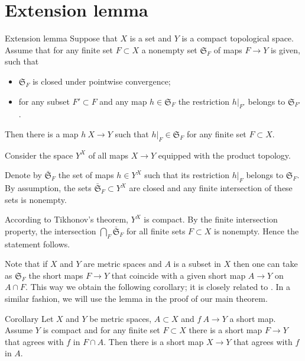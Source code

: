 \section{Extension lemma}\label{Finite-whole extension lemma}

\begin{thm}{Extension lemma}\label{lem:finite-whole}
Suppose that $X$ is a set 
and $Y$ is a compact topological space.
Assume that for any finite set $F\subset X$ 
a nonempty set $\mathfrak{S}_F$ of maps  $F\to Y$ is given, such that
\begin{itemize}
\item $\mathfrak{S}_F$ is closed under pointwise convergence;
\item for any subset $F'\subset F$ and any map $h\in \mathfrak{S}_F$
the restriction $h|_{F'}$ belongs to $\mathfrak{S}_{F'}$. 
\end{itemize}

Then there is a map $h\: X\to Y$ such that $h|_F\in \mathfrak{S}_F$ for any finite set $F\subset X$.
\end{thm}

Consider the space $Y^X$ of all maps $X\to Y$ equipped with the product topology.

Denote by $\bar{\mathfrak{S}}_F$ the set of maps $h\in Y^X$ such that its restriction $h|_F$ belongs to $\mathfrak{S}_F$.
By assumption, the sets $\bar{\mathfrak{S}}_F\subset Y^X$ are closed and any finite intersection of these sets is nonempty.

According to Tikhonov's theorem, $Y^X$ is compact.
By the finite intersection property, the intersection $\bigcap_F\bar{\mathfrak{S}}_F$ for all finite sets $F\subset X$ is nonempty.
Hence the statement follows.
\qeds

Note that if $X$ and $Y$ are metric spaces and $A$ is a subset in $X$
then one can take as $\mathfrak{S}_F$ the short maps $F\to Y$ that coincide with a given short map $A\to Y$ on $A\cap F$.
This way we obtain the following corollary; it is closely related to \cite[Proposition 5.2]{lang-shroeder}.
In a similar fashion, we will use the lemma in the proof of our main theorem.

\begin{thm}{Corollary}
Let $X$ and $Y$ be metric spaces, $A\subset X$ and $f\:A\to Y$ a short map.
Assume $Y$ is compact and for any finite set $F\subset X$ there is a short map $F\to Y$ that agrees with $f$ in $F\cap A$.
Then there is a short map $X\to Y$ that agrees with $f$ in $A$.
\end{thm}
